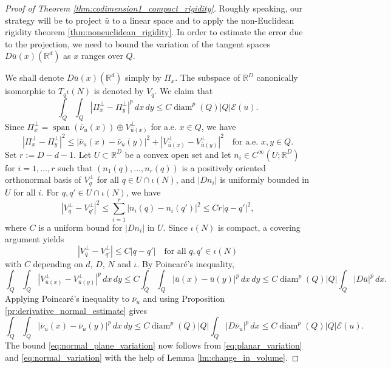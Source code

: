 \documentclass[10pt,a4paper]{amsart}
\DeclareMathOperator{\diam}{diam}
\DeclareMathOperator{\lspan}{span}
\begin{document}
\begin{proof}[Proof of Theorem \ref{thm:codimension1_compact_rigidity}]
    Roughly speaking, our strategy will be to project $\bar{u}$ to a linear space and to apply the non-Euclidean rigidity theorem \ref{thm:noneuclidean_rigidity}. In order to estimate the error due to the projection, we need to bound the variation of the tangent spaces $D\bar{u}(x)(\mathbb{R}^d)$ as $x$ ranges over $Q$.
    
    We shall denote $D\bar{u}(x)(\mathbb{R}^d)$ simply by $\Pi_x$. The subspace of $\mathbb{R}^D$ canonically isomorphic to $T_q\iota(N)$ is denoted by $V_q$. We claim that
    \begin{equation} \label{eq:normal_plane_variation}
        \int_Q \int_Q |\Pi_x^\perp - \Pi_y^\perp|^p \, dx \, dy \le C \diam^p(Q) |Q| \mathcal{E}(u).
    \end{equation}
    Since $\Pi_x^\perp = \lspan(\bar{\nu}_u(x)) \oplus V_{\bar{u}(x)}^\perp$ for a.e. $x \in Q$, we have
    \[
    |\Pi_x^\perp - \Pi_y^\perp|^2 \le |\bar{\nu}_u(x) - \bar{\nu}_u(y)|^2 + |V_{\bar{u}(x)}^\perp - V_{\bar{u}(y)}^\perp|^2 \quad \text{for a.e. } x, y \in Q.
    \]
    Set $r := D - d - 1$. Let $U \subset \mathbb{R}^D$ be a convex open set and let $n_i \in C^\infty(U; \mathbb{R}^D)$ for $i = 1, \dots, r$ such that $(n_1(q), \dots, n_r(q))$ is a positively oriented orthonormal basis of $V_{q}^\perp$ for all $q \in U \cap \iota(N)$, and $|Dn_i|$ is uniformly bounded in $U$ for all $i$. For $q, q' \in U \cap \iota(N)$, we have
    \[
    |V_q^\perp - V_{q'}^\perp|^2 \le \sum_{i = 1}^r |n_i(q) - n_i(q')|^2 \le Cr |q - q'|^2,
    \]
    where $C$ is a uniform bound for $|Dn_i|$ in $U$. Since $\iota(N)$ is compact, a covering argument yields
    \[
    |V_q^\perp - V_{q'}^\perp| \le C |q - q'| \quad \text{for all } q, q' \in \iota(N)
    \]
    with $C$ depending on $d$, $D$, $N$ and $\iota$. By Poincaré's inequality,
    \begin{equation} \label{eq:planar_variation}
        \int_Q \int_Q |V_{\bar{u}(x)}^\perp - V_{\bar{u}(y)}^\perp|^p \, dx \, dy \le C \int_Q \int_Q |\bar{u}(x) - \bar{u}(y)|^p \, dx \, dy \le C \diam^p(Q) |Q| \int_Q |D\bar{u}|^p \, dx.
    \end{equation}
    Applying Poincaré's inequality to $\bar{\nu}_u$ and using Proposition \ref{pr:derivative_normal_estimate} gives
    \begin{equation} \label{eq:normal_variation}
        \int_Q \int_Q |\bar{\nu}_u(x) - \bar{\nu}_u(y)|^p \, dx \, dy \le C \diam^p(Q) |Q| \int_Q |D\bar{\nu}_u|^p \, dx \le C \diam^p(Q) |Q| \mathcal{E}(u).
    \end{equation}
    The bound \eqref{eq:normal_plane_variation} now follows from \eqref{eq:planar_variation} and \eqref{eq:normal_variation} with the help of Lemma \ref{lm:change_in_volume}.


\end{proof}
\end{document}
